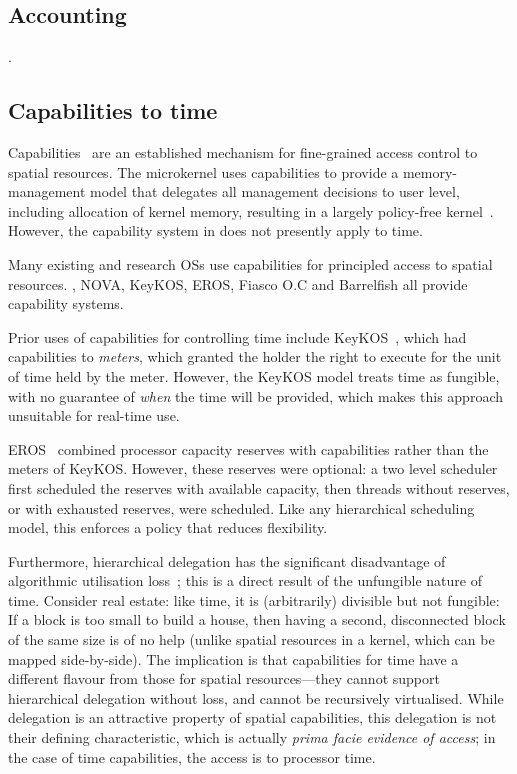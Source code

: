 \subsection{Accounting}

.

\subsection{Capabilities to time}
\label{s:os-capabilities}

Capabilities~\citep{Dennis_VanHorn_66} are an established mechanism for
fine-grained access control to spatial resources. The  \selfour
microkernel uses capabilities to provide a memory-management model
that delegates all management decisions to user level,
including allocation of kernel memory, resulting in a largely
policy-free
kernel~\citep{Elkaduwe_DE_08,Heiser_Elphinstone_16}.
However, the capability system in \selfour does not presently apply to time.

Many existing and research \glspl{OS} use capabilities for principled access to spatial resources. \composite, NOVA,
KeyKOS, EROS, Fiasco O.C and Barrelfish all provide capability systems. 

Prior uses of capabilities for controlling time include
KeyKOS~\citep{Bomberger_FFHLS_92}, which had capabilities to \emph{meters}, which granted the holder
the right to execute for the unit of time held by the meter.
However, the KeyKOS model treats time as fungible, with no guarantee
of \emph{when} the time will be provided, which makes this approach
unsuitable for real-time use.

EROS~\citep{Shapiro_SF_99} combined processor capacity reserves with capabilities rather than the
meters of KeyKOS. However, these reserves were optional: a two level scheduler first
scheduled the reserves with available capacity, then threads without reserves,
or with exhausted reserves, were scheduled.
Like any hierarchical scheduling model, this enforces a policy that
reduces flexibility.

Furthermore, hierarchical delegation has the significant disadvantage
of algorithmic utilisation loss~\citep{Lackorzynski_WVH_12}; this is a
direct result of the unfungible nature of time. Consider real
estate: like time, it is (arbitrarily) divisible but not fungible: If
a block is too small to build a house, then having a second,
disconnected block of the same size is of no help (unlike spatial resources in a kernel, which can
be mapped side-by-side). The implication is
that capabilities for time have a different flavour from those for
spatial resources---they cannot support hierarchical delegation
without loss, and cannot be recursively virtualised. While delegation is an
attractive property of spatial capabilities,
this delegation is not their defining characteristic, which is actually
\emph{prima facie evidence of access}; in the case of time
capabilities, the access is to processor time.

